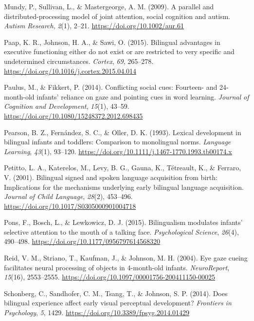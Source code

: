 \documentclass[english,,man,floatsintext]{apa6}
\begin{document}
\leavevmode\hypertarget{ref-Mundy_etal_2009}{}%
Mundy, P., Sullivan, L., \& Mastergeorge, A. M. (2009). A parallel and distributed-processing model of joint attention, social cognition and autism. \emph{Autism Research}, \emph{2}(1), 2--21. \url{https://doi.org/10.1002/aur.61}

\leavevmode\hypertarget{ref-Paap_etal_2015}{}%
Paap, K. R., Johnson, H. A., \& Sawi, O. (2015). Bilingual advantages in executive functioning either do not exist or are restricted to very specific and undetermined circumstances. \emph{Cortex}, \emph{69}, 265--278. \url{https://doi.org/10.1016/j.cortex.2015.04.014}

\leavevmode\hypertarget{ref-Paulus_Fikkert_2014}{}%
Paulus, M., \& Fikkert, P. (2014). Conflicting social cues: Fourteen- and 24-month-old infants' reliance on gaze and pointing cues in word learning. \emph{Journal of Cognition and Development}, \emph{15}(1), 43--59. \url{https://doi.org/10.1080/15248372.2012.698435}

\leavevmode\hypertarget{ref-Pearson_etal_1993}{}%
Pearson, B. Z., Fernández, S. C., \& Oller, D. K. (1993). Lexical development in bilingual infants and toddlers: Comparison to monolingual norms. \emph{Language Learning}, \emph{43}(1), 93--120. \url{https://doi.org/10.1111/j.1467-1770.1993.tb00174.x}

\leavevmode\hypertarget{ref-Petitto_etal_2001}{}%
Petitto, L. A., Katerelos, M., Levy, B. G., Gauna, K., Tétreault, K., \& Ferraro, V. (2001). Bilingual signed and spoken language acquisition from birth: Implications for the mechanisms underlying early bilingual language acquisition. \emph{Journal of Child Language}, \emph{28}(2), 453--496. \url{https://doi.org/10.1017/S0305000901004718}

\leavevmode\hypertarget{ref-Pons_etal_2015}{}%
Pons, F., Bosch, L., \& Lewkowicz, D. J. (2015). Bilingualism modulates infants' selective attention to the mouth of a talking face. \emph{Psychological Science}, \emph{26}(4), 490--498. \url{https://doi.org/10.1177/0956797614568320}

\leavevmode\hypertarget{ref-Reid_etal_2004}{}%
Reid, V. M., Striano, T., Kaufman, J., \& Johnson, M. H. (2004). Eye gaze cueing facilitates neural processing of objects in 4-month-old infants. \emph{NeuroReport}, \emph{15}(16), 2553--2555. \url{https://doi.org/10.1097/00001756-200411150-00025}

\leavevmode\hypertarget{ref-Schonberg_etal_2014}{}%
Schonberg, C., Sandhofer, C. M., Tsang, T., \& Johnson, S. P. (2014). Does bilingual experience affect early visual perceptual development? \emph{Frontiers in Psychology}, \emph{5}, 1429. \url{https://doi.org/10.3389/fpsyg.2014.01429}
\end{document}
